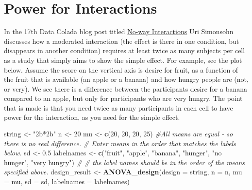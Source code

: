 \documentclass[]{book}
\newenvironment{Shaded}{\begin{snugshade}}{\end{snugshade}}
\newcommand{\CommentTok}[1]{\textcolor[rgb]{0.56,0.35,0.01}{\textit{#1}}}
\newcommand{\DataTypeTok}[1]{\textcolor[rgb]{0.13,0.29,0.53}{#1}}
\newcommand{\DecValTok}[1]{\textcolor[rgb]{0.00,0.00,0.81}{#1}}
\newcommand{\FloatTok}[1]{\textcolor[rgb]{0.00,0.00,0.81}{#1}}
\newcommand{\KeywordTok}[1]{\textcolor[rgb]{0.13,0.29,0.53}{\textbf{#1}}}
\newcommand{\NormalTok}[1]{#1}
\newcommand{\StringTok}[1]{\textcolor[rgb]{0.31,0.60,0.02}{#1}}
\begin{document}
\hypertarget{power-for-interactions}{%
\chapter{Power for Interactions}\label{power-for-interactions}}

In the 17th Data Colada blog post titled \href{http://datacolada.org/17}{No-way Interactions} Uri Simonsohn discusses how a moderated interaction (the effect is there in one condition, but disappears in another condition) requires at least twice as many subjects per cell as a study that simply aims to show the simple effect. For example, see the plot below. Assume the score on the vertical axis is desire for fruit, as a function of the fruit that is available (an apple or a banana) and how hungry people are (not, or very). We see there is a difference between the participants desire for a banana compared to an apple, but only for participants who are very hungry. The point that is made is that you need twice as many participants in each cell to have power for the interaction, as you need for the simple effect.

\begin{Shaded}
\begin{Highlighting}[]
\NormalTok{string <-}\StringTok{ "2b*2b"}
\NormalTok{n <-}\StringTok{ }\DecValTok{20}
\NormalTok{mu <-}\StringTok{ }\KeywordTok{c}\NormalTok{(}\DecValTok{20}\NormalTok{, }\DecValTok{20}\NormalTok{, }\DecValTok{20}\NormalTok{, }\DecValTok{25}\NormalTok{) }\CommentTok{#All means are equal - so there is no real difference.}
\CommentTok{# Enter means in the order that matches the labels below.}
\NormalTok{sd <-}\StringTok{ }\FloatTok{0.5}
\NormalTok{labelnames <-}\StringTok{ }\KeywordTok{c}\NormalTok{(}\StringTok{"fruit"}\NormalTok{, }\StringTok{"apple"}\NormalTok{, }\StringTok{"banana"}\NormalTok{, }\StringTok{"hunger"}\NormalTok{, }\StringTok{"no hunger"}\NormalTok{, }\StringTok{"very hungry"}\NormalTok{) }\CommentTok{#}
\CommentTok{# the label names should be in the order of the means specified above.}
\NormalTok{design_result <-}\StringTok{ }\KeywordTok{ANOVA_design}\NormalTok{(}\DataTypeTok{design =}\NormalTok{ string,}
                   \DataTypeTok{n =}\NormalTok{ n, }
                   \DataTypeTok{mu =}\NormalTok{ mu, }
                   \DataTypeTok{sd =}\NormalTok{ sd, }
                   \DataTypeTok{labelnames =}\NormalTok{ labelnames)}
\end{Highlighting}
\end{Shaded}
\end{document}
